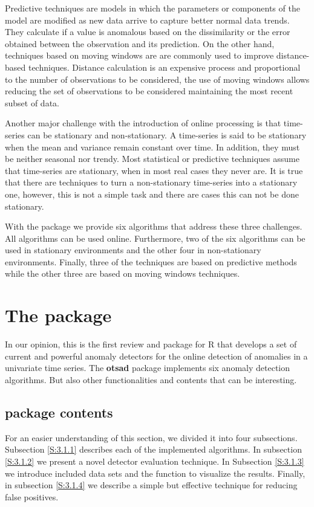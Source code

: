 \documentclass[a4paper]{article}\usepackage[]{graphicx}\usepackage[]{color}
\begin{document}
Predictive techniques are models in which the parameters or components of the model are modified as new data arrive to capture better normal data trends. They calculate if a value is anomalous based on the dissimilarity or the error obtained between the observation and its prediction. On the other hand, techniques based on moving windows are are commonly used to improve distance-based techniques. Distance calculation is an expensive process and proportional to the number of observations to be considered, the use of moving windows allows reducing the set of observations to be considered maintaining the most recent subset of data.

Another major challenge with the introduction of online processing is that time-series can be stationary and non-stationary. A time-series is said to be stationary when the mean and variance remain constant over time. In addition, they must be neither seasonal nor trendy. Most statistical or predictive techniques assume that time-series are stationary, when in most real cases they never are. It is true that there are techniques to turn a non-stationary time-series into a stationary one, however, this is not a simple task and there are cases this can not be done stationary.

With the  package we provide six algorithms that address these three challenges. All algorithms can be used online. Furthermore, two of the six algorithms can be used in stationary environments and the other four in non-stationary environments. Finally, three of the techniques are based on predictive methods while the other three are based on moving windows techniques.

\section{The  package}\label{sec:package}

In our opinion, this is the first review and package for R that develops a set of current and powerful anomaly detectors for the online detection of anomalies in a univariate time series. The \textbf{otsad} package implements six anomaly detection algorithms. But also other functionalities and contents that can be interesting.

\subsection{package contents} \label{S:3.1}

For an easier understanding of this section, we divided it into four subsections. Subsection \ref{S:3.1.1} describes each of the implemented algorithms. In subsection \ref{S:3.1.2} we present a novel detector evaluation technique. In Subsection \ref{S:3.1.3} we introduce included data sets and the function to visualize the results. Finally, in subsection \ref{S:3.1.4} we describe a simple but effective technique for reducing false positives.
\end{document}
